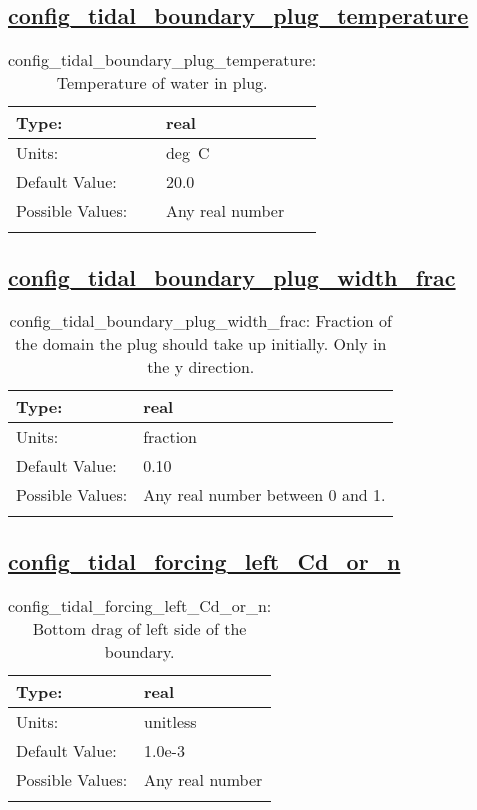 \subsection[config\_tidal\_boundary\_plug\_temperature]{\hyperref[sec:nm_tab_tidal_boundary]{config\_tidal\_boundary\_plug\_temperature}}
\label{subsec:nm_sec_config_tidal_boundary_plug_temperature}
\begin{center}
\begin{longtable}{| p{2.0in} || p{4.0in} |}
    \hline
    Type: & real \\
    \hline
    Units: & \si{deg.C} \\
    \hline
    Default Value: & 20.0 \\
    \hline
    Possible Values: & Any real number \\
    \hline
    \caption{config\_tidal\_boundary\_plug\_temperature: Temperature of water in plug.}
\end{longtable}
\end{center}
\subsection[config\_tidal\_boundary\_plug\_width\_frac]{\hyperref[sec:nm_tab_tidal_boundary]{config\_tidal\_boundary\_plug\_width\_frac}}
\label{subsec:nm_sec_config_tidal_boundary_plug_width_frac}
\begin{center}
\begin{longtable}{| p{2.0in} || p{4.0in} |}
    \hline
    Type: & real \\
    \hline
    Units: & \si{fraction} \\
    \hline
    Default Value: & 0.10 \\
    \hline
    Possible Values: & Any real number between 0 and 1. \\
    \hline
    \caption{config\_tidal\_boundary\_plug\_width\_frac: Fraction of the domain the plug should take up initially. Only in the y direction.}
\end{longtable}
\end{center}
\subsection[config\_tidal\_forcing\_left\_Cd\_or\_n]{\hyperref[sec:nm_tab_tidal_boundary]{config\_tidal\_forcing\_left\_Cd\_or\_n}}
\label{subsec:nm_sec_config_tidal_forcing_left_Cd_or_n}
\begin{center}
\begin{longtable}{| p{2.0in} || p{4.0in} |}
    \hline
    Type: & real \\
    \hline
    Units: & \si{unitless} \\
    \hline
    Default Value: & 1.0e-3 \\
    \hline
    Possible Values: & Any real number \\
    \hline
    \caption{config\_tidal\_forcing\_left\_Cd\_or\_n: Bottom drag of left side of the boundary.}
\end{longtable}
\end{center}
